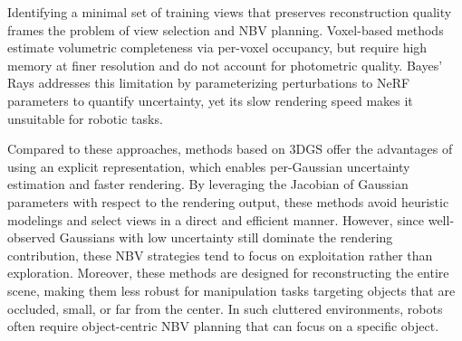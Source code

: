 Identifying a minimal set of training views that preserves reconstruction quality frames the problem of view selection and \acf{NBV} planning. Voxel-based methods \cite{zhang2023affordance, jin2025activegs} estimate volumetric completeness via per-voxel occupancy, but require high memory at finer resolution and do not account for photometric quality. Bayes’ Rays \cite{goli2024bayes} addresses this limitation by parameterizing perturbations to \ac{NeRF} \cite{mildenhall2021nerf} parameters to quantify uncertainty, yet its slow rendering speed makes it unsuitable for robotic tasks. 



Compared to these approaches, methods \cite{jiang2024fisherrf, wilson2025pop, strong2024next} based on \acf{3DGS} \cite{kerbl20233d} offer the advantages of using an explicit representation, which enables per-Gaussian uncertainty estimation and faster rendering. By leveraging the Jacobian of Gaussian parameters with respect to the rendering output, these methods avoid heuristic modelings and select views in a direct and efficient manner. However, since well-observed Gaussians with low uncertainty still dominate the rendering contribution, these \ac{NBV} strategies tend to focus on exploitation rather than exploration. Moreover, these methods are designed for reconstructing the entire scene, making them less robust for manipulation tasks targeting objects that are occluded, small, or far from the center. In such cluttered environments, robots often require object-centric \ac{NBV} planning that can focus on a specific object.

